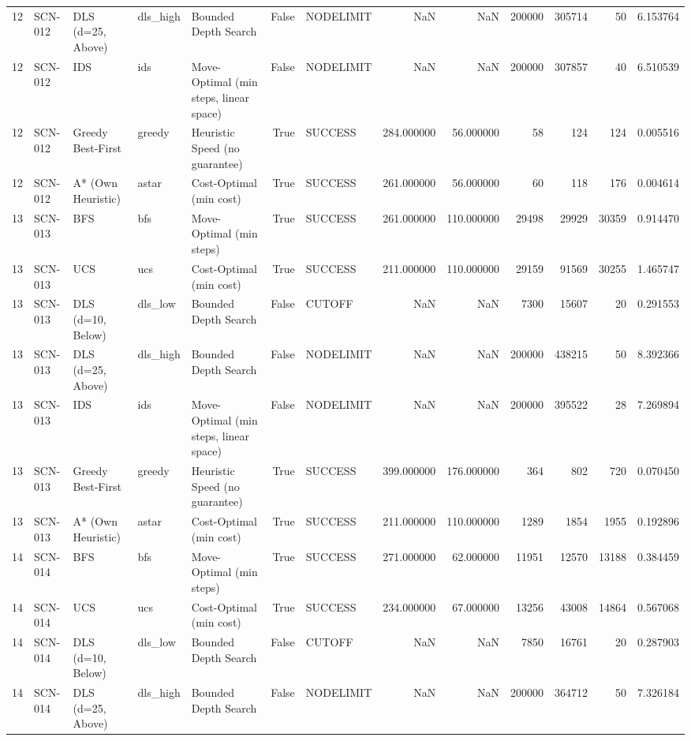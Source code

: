 \begin{table}[htbp]
\begin{tabular}{rllllrlrrrrrr}
12 & SCN-012 & DLS (d=25, Above) & dls\_high & Bounded Depth Search & False & NODELIMIT & NaN & NaN & 200000 & 305714 & 50 & 6.153764 \\
12 & SCN-012 & IDS & ids & Move-Optimal (min steps, linear space) & False & NODELIMIT & NaN & NaN & 200000 & 307857 & 40 & 6.510539 \\
12 & SCN-012 & Greedy Best-First & greedy & Heuristic Speed (no guarantee) & True & SUCCESS & 284.000000 & 56.000000 & 58 & 124 & 124 & 0.005516 \\
12 & SCN-012 & A* (Own Heuristic) & astar & Cost-Optimal (min cost) & True & SUCCESS & 261.000000 & 56.000000 & 60 & 118 & 176 & 0.004614 \\
13 & SCN-013 & BFS & bfs & Move-Optimal (min steps) & True & SUCCESS & 261.000000 & 110.000000 & 29498 & 29929 & 30359 & 0.914470 \\
13 & SCN-013 & UCS & ucs & Cost-Optimal (min cost) & True & SUCCESS & 211.000000 & 110.000000 & 29159 & 91569 & 30255 & 1.465747 \\
13 & SCN-013 & DLS (d=10, Below) & dls\_low & Bounded Depth Search & False & CUTOFF & NaN & NaN & 7300 & 15607 & 20 & 0.291553 \\
13 & SCN-013 & DLS (d=25, Above) & dls\_high & Bounded Depth Search & False & NODELIMIT & NaN & NaN & 200000 & 438215 & 50 & 8.392366 \\
13 & SCN-013 & IDS & ids & Move-Optimal (min steps, linear space) & False & NODELIMIT & NaN & NaN & 200000 & 395522 & 28 & 7.269894 \\
13 & SCN-013 & Greedy Best-First & greedy & Heuristic Speed (no guarantee) & True & SUCCESS & 399.000000 & 176.000000 & 364 & 802 & 720 & 0.070450 \\
13 & SCN-013 & A* (Own Heuristic) & astar & Cost-Optimal (min cost) & True & SUCCESS & 211.000000 & 110.000000 & 1289 & 1854 & 1955 & 0.192896 \\
14 & SCN-014 & BFS & bfs & Move-Optimal (min steps) & True & SUCCESS & 271.000000 & 62.000000 & 11951 & 12570 & 13188 & 0.384459 \\
14 & SCN-014 & UCS & ucs & Cost-Optimal (min cost) & True & SUCCESS & 234.000000 & 67.000000 & 13256 & 43008 & 14864 & 0.567068 \\
14 & SCN-014 & DLS (d=10, Below) & dls\_low & Bounded Depth Search & False & CUTOFF & NaN & NaN & 7850 & 16761 & 20 & 0.287903 \\
14 & SCN-014 & DLS (d=25, Above) & dls\_high & Bounded Depth Search & False & NODELIMIT & NaN & NaN & 200000 & 364712 & 50 & 7.326184 \\

\end{tabular}
\end{table}
